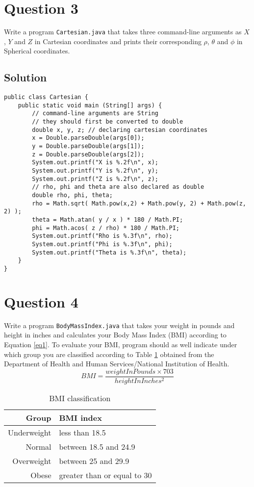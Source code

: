\section*{Question 3}
Write a program \texttt{Cartesian.java} that takes three command-line arguments as $X$, $Y$ and $Z$ in Cartesian coordinates and prints their corresponding $\rho$, $\theta$ and $\phi$ in Spherical coordinates.

\subsection*{Solution}
\lstset{language=Java,tabsize=2}
\begin{lstlisting}
public class Cartesian {
	public static void main (String[] args) {
		// command-line arguments are String
		// they should first be converted to double
		double x, y, z; // declaring cartesian coordinates
		x = Double.parseDouble(args[0]);
		y = Double.parseDouble(args[1]);
		z = Double.parseDouble(args[2]);
		System.out.printf("X is %.2f\n", x);
		System.out.printf("Y is %.2f\n", y);
		System.out.printf("Z is %.2f\n", z);
		// rho, phi and theta are also declared as double
		double rho, phi, theta;
		rho = Math.sqrt( Math.pow(x,2) + Math.pow(y, 2) + Math.pow(z, 2) );
		theta = Math.atan( y / x ) * 180 / Math.PI;
		phi = Math.acos( z / rho) * 180 / Math.PI;
		System.out.printf("Rho is %.3f\n", rho);
		System.out.printf("Phi is %.3f\n", phi);
		System.out.printf("Theta is %.3f\n", theta);
	}
}
\end{lstlisting}

\section*{Question 4}
Write a program \texttt{BodyMassIndex.java} that takes your weight in pounds and height in inches and calculates your Body Mass Index (BMI) according to Equation \ref{eq1}. To evaluate your BMI, program should as well indicate under which group you are classified according to Table \ref{tab2} obtained from the Department of Health and Human Services/National Institution of Health.
\begin{equation}
BMI = \frac{weightInPounds \times 703}{heightInInches^2}
\label{eq1}
\end{equation}
\begin{table}[H]\centering
\begin{tabular}{|r|l|}
\hline
Group & BMI index \\
\hline
Underweight & less than 18.5 \\
Normal & between 18.5 and 24.9 \\
Overweight & between 25 and 29.9 \\
Obese & greater than or equal to 30 \\
\hline
\end{tabular}
\caption{BMI classification}\label{tab2}
\end{table}
